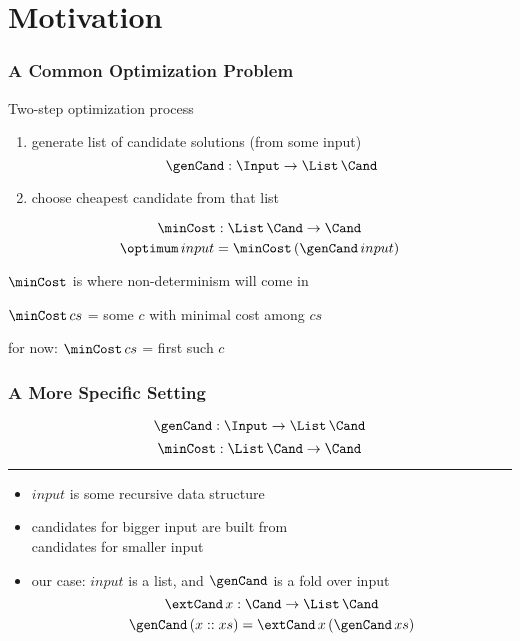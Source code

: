 \documentclass{beamer}
\def\inp{input}
\begin{document}
\section{Motivation}

\begin{frame}\frametitle{A Common Optimization Problem}
Two-step optimization process
\begin{enumerate}
\item generate list of candidate solutions (from some input)
 \[\genCand: \Input\to \List\, \Cand\]
\item choose cheapest candidate from that list
\end{enumerate}
\[\minCost: \List\, \Cand \to \Cand\]
\[\optimum\,\inp = \minCost\,(\genCand\,\inp)\]

\begin{blockitems}{$\minCost$ is where non-determinism will come in}
\item $\minCost\,cs$ = \alert{some} $c$ with minimal cost among $cs$
\item for now: $\minCost\, cs$ = \alert{first} such $c$
\end{blockitems}
\end{frame}


\begin{frame}\frametitle{A More Specific Setting}
\color{gray}
\[\genCand: \Input\to \List\, \Cand\]
\[\minCost: \List\, \Cand \to \Cand\]
\hrule
\vspace{.5cm}

\begin{itemize}
\item $\inp$ is some recursive data structure
\item candidates for bigger input are built from \\ candidates for smaller input
\item our case: $\inp$ is a list, and $\genCand$ is a fold over \inp
 \[\extCand\,x: \Cand \to \List\,\Cand\]
 \[\genCand\, (x::xs) = \extCand\, x\,(\genCand\,xs)\]
\end{itemize}
\end{frame}
\end{document}
